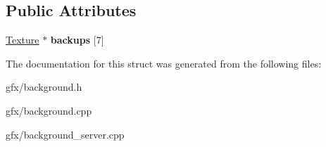 \subsection*{Public Attributes}
\begin{DoxyCompactItemize}
\item 
\hyperlink{classTexture}{Texture} $\ast$ {\bfseries backups} \mbox{[}7\mbox{]}\hypertarget{structBackground_1_1BackgroundClone_ad47964dea07010a6b85c755b71b87f05}{}\label{structBackground_1_1BackgroundClone_ad47964dea07010a6b85c755b71b87f05}

\end{DoxyCompactItemize}


The documentation for this struct was generated from the following files\+:\begin{DoxyCompactItemize}
\item 
gfx/background.\+h\item 
gfx/background.\+cpp\item 
gfx/background\+\_\+server.\+cpp\end{DoxyCompactItemize}
